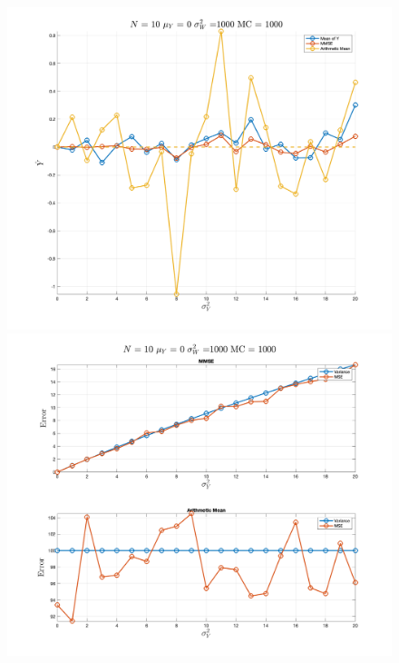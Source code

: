 \begin{figure}[H]
    \centering
    \begin{minipage}{0.45\textwidth}
        \centering
        \includegraphics[width=\textwidth]{./figures/appendix_a/figure_10.png}
    \end{minipage}
    \hfill
    \begin{minipage}{0.45\textwidth}
        \centering
        \includegraphics[width=\textwidth]{./figures/appendix_a/figure_11.png}
    \end{minipage}
\end{figure}

